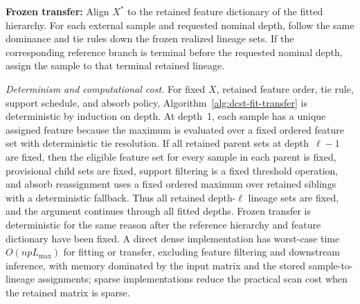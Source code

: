 \documentclass[11pt]{article}
\begin{document}
\begin{samepage}
\begin{minipage}{\linewidth}
\textbf{Frozen transfer:}
Align \(X^{\ast}\) to the retained feature dictionary of the fitted hierarchy.
For each external sample and requested nominal depth, follow the same dominance
and tie rules down the frozen realized lineage sets. If the corresponding
reference branch is terminal before the requested nominal depth, assign the
sample to that terminal retained lineage.
\end{minipage}
\end{samepage}

\textit{Determinism and computational cost.} For fixed \(X\), retained feature
order, tie rule, support schedule, and absorb policy, Algorithm~\ref{alg:dcst-fit-transfer}
is deterministic by induction on depth. At depth~1, each sample has a unique
assigned feature because the maximum is evaluated over a fixed ordered feature
set with deterministic tie resolution. If all retained parent sets at
depth~\(\ell-1\) are fixed, then the eligible feature set for every sample in
each parent is fixed, provisional child sets are fixed, support filtering is a
fixed threshold operation, and absorb reassignment uses a fixed ordered maximum
over retained siblings with a deterministic fallback. Thus all retained
depth-\(\ell\) lineage sets are fixed, and the argument continues through all
fitted depths. Frozen transfer is deterministic for the same reason after the
reference hierarchy and feature dictionary have been fixed. A direct dense
implementation has worst-case time \(O(n p L_{\max})\) for fitting or transfer,
excluding feature filtering and downstream inference, with memory dominated by
the input matrix and the stored sample-to-lineage assignments; sparse
implementations reduce the practical scan cost when the retained matrix is
sparse.
\end{document}
